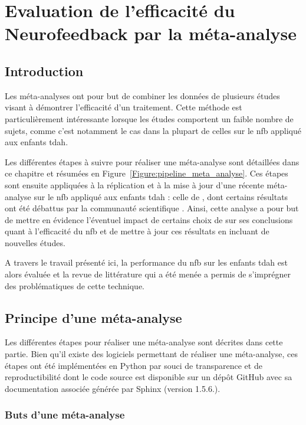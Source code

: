 \chapter{Evaluation de l'efficacité du Neurofeedback par la méta-analyse} \label{chapitre-2}

\section*{Introduction}
Les méta-analyses ont pour but de combiner les données de plusieurs études visant à démontrer l'efficacité d'un traitement. Cette méthode est
particulièrement intéressante lorsque les études comportent un faible nombre de sujets, comme c'est notamment le cas dans la plupart de celles sur 
le \gls{nfb} appliqué aux enfants \gls{tdah}. 

Les différentes étapes à suivre pour réaliser une méta-analyse sont détaillées dans ce chapitre et résumées en Figure~\ref{Figure:pipeline_meta_analyse}.
Ces étapes sont ensuite appliquées à la réplication et à la mise à jour d'une récente méta-analyse sur le \gls{nfb} appliqué aux enfants \gls{tdah} :
celle de \citet{Cortese2016}, dont certains résultats ont été débattus par la communauté scientifique \citep{Micoulaud2016}. Ainsi, cette analyse a pour but
de mettre en évidence l'éventuel impact de certains choix de \citet{Cortese2016} sur ses conclusions quant à l'efficacité du \gls{nfb} et de mettre à jour
ces résultats en incluant de nouvelles études. 

A travers le travail présenté ici, la performance du \gls{nfb} sur les enfants \gls{tdah} est alors évaluée et la revue de littérature
qui a été menée a permis de s'imprégner des problématiques de cette technique.

\clearpage

\section{Principe d'une méta-analyse} \label{methods}

Les différentes étapes pour réaliser une méta-analyse sont décrites dans cette partie. Bien qu'il existe des logiciels permettant de réaliser une
méta-analyse, ces étapes ont été implémentées en Python par souci de transparence et de reproductibilité dont le code source est disponible sur un 
dépôt GitHub \citep{Bussalb2019clinical} avec sa documentation associée générée par Sphinx (version 1.5.6.).

\subsection{Buts d'une méta-analyse}

